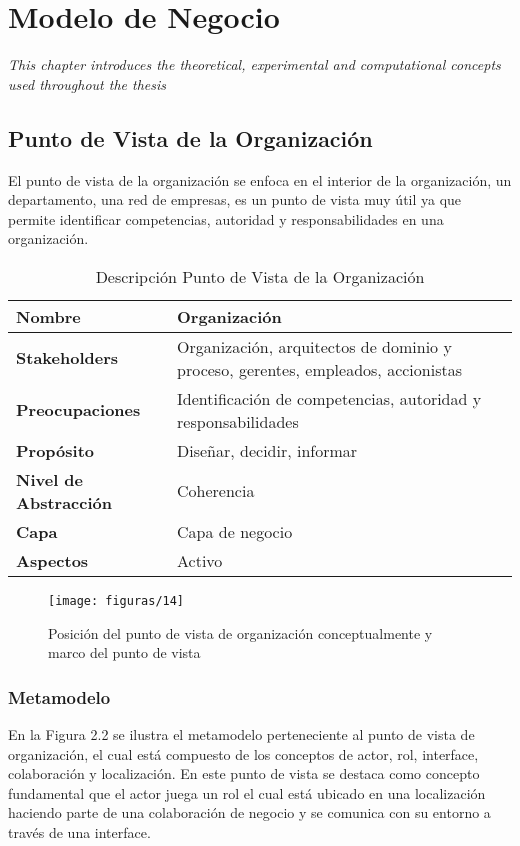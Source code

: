 \chapter{Modelo de Negocio}
\label{chap:Negocio}
\textit{This chapter introduces the theoretical, experimental and computational concepts used throughout the thesis}
\vspace{2ex}\vfill
\minitoc
\newpage

\section{Punto de Vista de la Organización}
 El punto de vista de la organización se enfoca en el interior de la organización, un departamento, una red de empresas, es un punto de vista muy útil ya que permite identificar  competencias, autoridad y responsabilidades en una organización.
 
  \begin{table}[H]
	\centering
	\begin{tabular}{p{3.7cm}p{8cm}}
		\hline
		\rowcolor[HTML]{0073a1}
		{\color[HTML]{FFFFFF} \textbf{Nombre}} & {\color[HTML]{FFFFFF} \textbf{Organización}} \\
		\hline
		\textbf{Stakeholders} & Organización, arquitectos de dominio y proceso, gerentes, empleados, accionistas \\
		\textbf{Preocupaciones} & Identificación de competencias, autoridad y responsabilidades \\
		\textbf{Propósito} & Diseñar, decidir, informar \\
		\textbf{Nivel de Abstracción} & Coherencia \\
		\textbf{Capa} & Capa de negocio \\
		\textbf{Aspectos} & Activo \\
		\bottomrule
	\end{tabular}
	\captionsetup{width=.95\textwidth}
	\caption{Descripción Punto de Vista de la Organización}
	\label{tabla4}
  \end{table}

  \begin{figure}[H]
 	\centering
 	\texttt{[image: figuras/14]}
 	\captionsetup{width=.95\textwidth}
 	\caption{Posición del punto de vista de organización conceptualmente y marco del punto de vista}
 	\label{figura14}
  \end{figure}

  \subsection{Metamodelo}
  En la Figura 2.2 se ilustra el metamodelo perteneciente al punto de vista de organización, el cual está compuesto de los conceptos de actor, rol, interface, colaboración y localización. En este punto de vista se destaca como concepto fundamental que el actor juega un rol el cual está ubicado en una localización haciendo parte de una colaboración de negocio y se comunica con su entorno a través de una interface.
 
